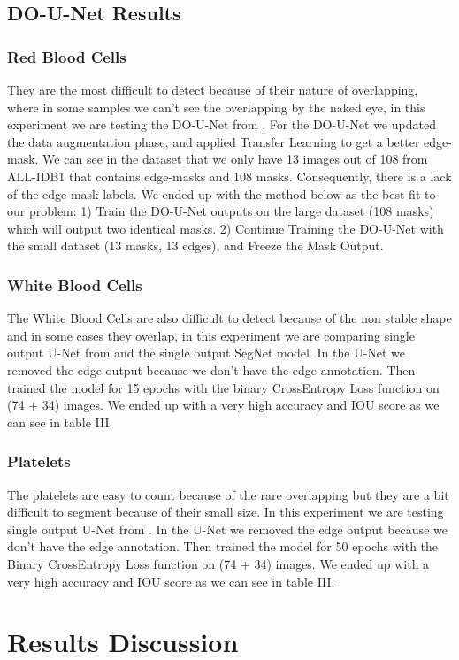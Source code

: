 \documentclass[conference]{IEEEtran}
\begin{document}
\subsection{DO-U-Net Results}
\subsubsection{Red Blood Cells}
They are the most difficult to detect because of their nature of overlapping, where in some samples we can’t see the overlapping by the naked eye, in this experiment we are testing the DO-U-Net from \cite{12}. For the DO-U-Net we updated the data augmentation phase, and applied Transfer Learning to get a better edge-mask. We can see in the dataset that we only have 13 images out of 108 from ALL-IDB1 that contains edge-masks and 108 masks. Consequently, there is a lack of the edge-mask labels. We ended up with the method below as the best fit to our problem: 
1) Train the DO-U-Net outputs on the large dataset (108 masks) which will output two identical masks.
2) Continue Training the DO-U-Net with the small dataset (13 masks, 13 edges), and Freeze the Mask Output.
\subsubsection{White Blood Cells}
The White Blood Cells are also difficult to detect because of the non stable shape and in some cases they overlap, in this experiment we are comparing single output U-Net from \cite{12} and the single output SegNet model. In the U-Net we removed the edge output because we don’t have the edge annotation. Then trained the model for 15 epochs with the binary CrossEntropy Loss function on (74 + 34) images. We ended up with a very high accuracy and IOU score as we can see in table III.
\subsubsection{Platelets}
The platelets are easy to count because of the rare overlapping but they are a bit difficult to segment because of their small size. In this experiment we are testing single output U-Net from \cite{12}. In the U-Net we removed the edge output because we don’t have the edge annotation. Then trained the model for 50 epochs with the Binary CrossEntropy Loss function on (74 + 34) images. We ended up with a very high accuracy and IOU score as we can see in table III.
\section{Results Discussion}
\end{document}
